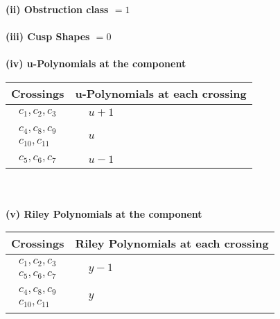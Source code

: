 \documentclass[1p]{elsarticle_modified}
\theoremstyle{definition}
\begin{document}
\flushleft \textbf{(ii) Obstruction class $= 1$}\\~\\
\flushleft \textbf{(iii) Cusp Shapes $= 0$}\\~\\
\newpage\renewcommand{\arraystretch}{1}
\flushleft \textbf{(iv) u-Polynomials at the component}\newline \\
\begin{tabular}{m{50pt}|m{274pt}}
Crossings & \hspace{64pt}u-Polynomials at each crossing \\
\hline $$\begin{aligned}c_{1},c_{2},c_{3}\end{aligned}$$&$\begin{aligned}
&u+1
\end{aligned}$\\
\hline $$\begin{aligned}c_{4},c_{8},c_{9}\\c_{10},c_{11}\end{aligned}$$&$\begin{aligned}
&u
\end{aligned}$\\
\hline $$\begin{aligned}c_{5},c_{6},c_{7}\end{aligned}$$&$\begin{aligned}
&u-1
\end{aligned}$\\
\hline
\end{tabular}\\~\\
\newpage\renewcommand{\arraystretch}{1}
\flushleft \textbf{(v) Riley Polynomials at the component}\newline \\
\begin{tabular}{m{50pt}|m{274pt}}
Crossings & \hspace{64pt}Riley Polynomials at each crossing \\
\hline $$\begin{aligned}c_{1},c_{2},c_{3}\\c_{5},c_{6},c_{7}\end{aligned}$$&$\begin{aligned}
&y-1
\end{aligned}$\\
\hline $$\begin{aligned}c_{4},c_{8},c_{9}\\c_{10},c_{11}\end{aligned}$$&$\begin{aligned}
&y
\end{aligned}$\\
\hline
\end{tabular}\\~\\
\end{document}
